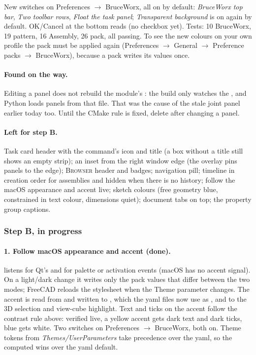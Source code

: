 New switches on Preferences $\rightarrow$ BruceWorx, all on by default: \emph{BruceWorx top bar}, \emph{Two
toolbar rows}, \emph{Float the task panel}; \emph{Transparent background} is on again by default. OK/Cancel at the
bottom reads  (no checkbox yet). Tests: 10 BruceWorx, 19 pattern, 16 Assembly, 26 pack, all passing.
To see the new colours on your own profile the pack must be applied again (Preferences $\rightarrow$ General
$\rightarrow$ Preference packs $\rightarrow$ BruceWorx), because a pack writes its values once.

\paragraph{Found on the way.} Editing a  panel does not rebuild the module's : the build
only watches the , and Python loads panels from that file. That was the cause of the stale joint
panel earlier today too. Until the CMake rule is fixed, delete 
after changing a panel.

\paragraph{Left for step B.} Task card header with the command's icon and title (a box without a title still
shows an empty strip); an inset from the right window edge (the overlay pins panels to the edge);
\textsc{Browser} header and badges; navigation pill; timeline in creation order for assemblies and hidden when
there is no history; follow the macOS appearance and accent live; sketch colours (free geometry blue,
constrained in text colour, dimensions quiet); document tabs on top; the property group captions.

\subsubsection*{Step B, in progress}

\paragraph{1. Follow macOS appearance and accent (done).}  listens for Qt's
 and for palette or activation events (macOS has no accent signal). On a light/dark
change it writes only the pack values that differ between the two modes; FreeCAD reloads the stylesheet when the
Theme parameter changes. The accent is read from  and written to
, which the yaml files now use as , and to the 3D selection and
view-cube highlight. Text and ticks on the accent follow the contrast rule above: verified live, a yellow
accent gets dark text and dark ticks, blue gets white. Two switches on Preferences $\rightarrow$ BruceWorx, both on.
Theme tokens from \emph{Themes/UserParameters} take precedence over the yaml, so the computed
 wins over the yaml default.
